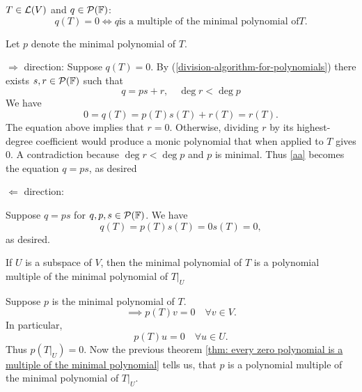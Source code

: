 \setcounter{thm}{28}
\begin{thm}
  \label{thm: every zero polynomial is a multiple of the minimal polynomial}
  $T\in \mathcal{L}(V)$ and $q \in \mathcal{P} (\mathbb{F})$: 
  \begin{equation}
    q(T)=0 \iff q \text{is a multiple of the minimal polynomial of} T.
  \end{equation}
\end{thm}
\begin{prf}
  Let $p$ denote the minimal polynomial of $T$.

	\begin{description}
  
  \item{$\Rightarrow$ direction:}{
			Suppose $q(T)=0$.
			By (\ref{division-algorithm-for-polynomials}) there exists $s,r \in \mathcal{P} (\mathbb{F})$ such that
			\begin{equation}
				q=ps+r, \quad \deg r < \deg p
			\end{equation}
			We have
			\begin{equation}
				\label{aa}
				0 = q(T) = p(T)s(T) + r(T) = r(T).
			\end{equation}
			The equation above implies that $r=0$. Otherwise, dividing $r$ by its highest-degree coefficient would produce a monic polynomial that when applied to $T$ gives $0$. A contradiction because $\deg r < \deg p$ and $p$ is minimal. Thus \ref{aa} becomes the equation $q=ps$, as desired
		}
		\item{$\Leftarrow$ direction:}{
			Suppose $q=ps$ for $q,p,s \in \mathcal{P}(\mathbb{F})$. We have
			\begin{equation}
				q(T) = p(T)s(T)=0s(T)=0,
			\end{equation}
			as desired. 
      
		}
	\end{description}
  
\end{prf}

\setcounter{thm}{30}
\begin{thm}
  \label{thm: minimal polynomial of a restriction operator}
  If $U$ is a subspace of $V$, then the minimal polynomial of $T$ is a polynomial multiple of the minimal polynomial of $\left .T \right | _{ U}$
\end{thm}
\begin{prf}
  Suppose $p$ is the minimal polynomial of $T$.
  \begin{equation}
    \implies p(T)v=0 \quad \forall v \in V.
  \end{equation}
  In particular,
  \begin{equation}
    p(T)u=0 \quad \forall u\in U.
  \end{equation} Thus $p\left( \left.T\right|_{U} \right)=0.$ Now the previous theorem
  \autoref{thm: every zero polynomial is a multiple of the minimal polynomial} tells us, that $p$ is a polynomial multiple of the minimal polynomial of $\left. T \right |_U$.
\end{prf}

